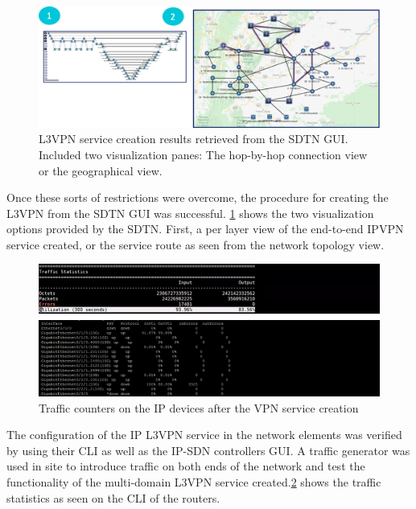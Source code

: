 \documentclass[a4paper,fleqn]{cas-dc}
\begin{document}
\begin{figure}
	\centering
		\includegraphics[width=\linewidth]{figs/l3vpn_results.png}
	\caption{L3VPN service creation results retrieved from the SDTN GUI. Included two visualization panes: The hop-by-hop connection view or the geographical view.}
	\label{FIG:l3vpn_results}
\end{figure}

Once these sorts of restrictions were overcome, the procedure for creating the L3VPN from the SDTN GUI was successful. \ref{FIG:l3vpn_results} shows the two visualization options provided by the SDTN. First, a per layer view of the end-to-end IPVPN service created, or the service route as seen from the network topology view.

\begin{figure}
	\centering
		\includegraphics[width=\linewidth]{figs/counters.png}
	\caption{Traffic counters on the IP devices after the VPN service creation}
	\label{FIG:counters}
\end{figure}

The configuration of the IP L3VPN service in the network elements was verified by using their CLI as well as the IP-SDN controllers GUI. A traffic generator was used in site to introduce traffic on both ends of the network and test the functionality of the multi-domain L3VPN service created.\ref{FIG:counters} shows the traffic statistics as seen on the CLI of the routers.
\end{document}
